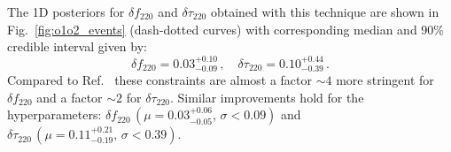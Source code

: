 \documentclass[twocolumn,prd,aps,superscriptaddress,preprintnumbers,tightenlines,showpacs,nofootinbib,eqsecnum,amsfonts,amsmath]{revtex4-1}
\newcommand{\df}[1]{\delta f_{\text{#1}}}
\newcommand{\dtau}[1]{\delta \tau_{\text{#1}}}
\begin{document}
The 1D posteriors for $\df{220}$ and $ \dtau{220}$ obtained with this technique are shown in Fig.~\ref{fig:o1o2_events} (dash-dotted curves) with corresponding median and 90\% credible interval given by: 
%
\begin{equation}
\df{220}=0.03^{+0.10}_{-0.09}\,,\quad \dtau{220}=0.10^{+0.44}_{-0.39}\,.
\end{equation}
Compared to Ref.~\cite{Abbott:2020jks} these constraints are almost a factor $\sim 4$ more stringent for $\df{220}$ and a factor $\sim 2$ for $\dtau{220}$. Similar improvements hold for the hyperparameters: $\df{220}\,(\mu=0.03^{+0.06}_{-0.05},\,\sigma<0.09)$ and $\dtau{220}\,(\mu=0.11^{+0.21}_{-0.19},\,\sigma<0.39)$.


\end{document}
